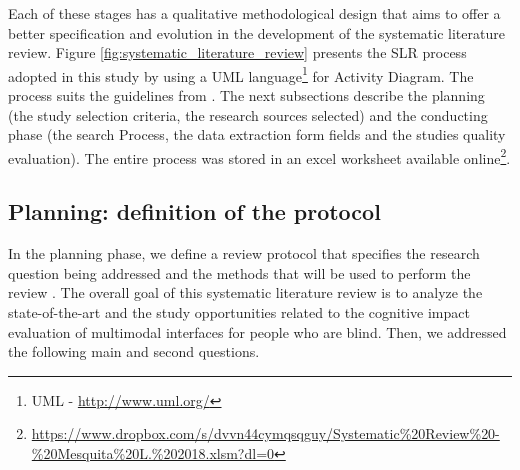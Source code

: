 Each of these stages has a qualitative methodological design that aims to offer a better specification and evolution in the development of the systematic literature review. Figure \ref{fig:systematic_literature_review} presents the SLR process adopted in this study by using a UML language\footnote{UML - \url{http://www.uml.org/}} for Activity Diagram. The process suits the guidelines from \cite{Kitchenham2007}. The next subsections describe the planning (the study selection criteria, the research sources selected) and the conducting phase (the search Process, the data extraction form fields and the studies quality evaluation). The entire process was stored in an excel worksheet available online\footnote{\url{https://www.dropbox.com/s/dvvn44cymqsqguy/Systematic\%20Review\%20-\%20Mesquita\%20L.\%202018.xlsm?dl=0}}.

 	\begin{figure}[h] 
   	    \captionsetup{width=16cm}%
	\end{figure}

\subsection{Planning: definition of the protocol}
\label{subsec:methodology-planning}

In the planning phase, we define a review protocol that specifies the research question being addressed and the methods that will be used to perform the review \cite{Kitchenham2007}. The overall goal of this systematic literature review is to analyze the state-of-the-art and the study opportunities related to the cognitive impact evaluation of multimodal interfaces for people who are blind. Then, we addressed the following main and second questions.

